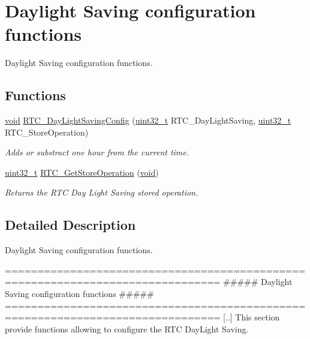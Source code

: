 \hypertarget{group___r_t_c___group5}{\section{Daylight Saving configuration functions}
\label{group___r_t_c___group5}
}


Daylight Saving configuration functions.  


\subsection*{Functions}
\begin{DoxyCompactItemize}
\item 
\hyperlink{group___n_a_m_e_ga18028b8badbf1ea7e704ccac3c488e82}{void} \hyperlink{group___r_t_c___group5_ga812feddea77990b5dc336a4989ae61b8}{R\-T\-C\-\_\-\-Day\-Light\-Saving\-Config} (\hyperlink{stdint_8h_a435d1572bf3f880d55459d9805097f62}{uint32\-\_\-t} R\-T\-C\-\_\-\-Day\-Light\-Saving, \hyperlink{stdint_8h_a435d1572bf3f880d55459d9805097f62}{uint32\-\_\-t} R\-T\-C\-\_\-\-Store\-Operation)
\begin{DoxyCompactList}\small\item\em Adds or substract one hour from the current time. \end{DoxyCompactList}\item 
\hyperlink{stdint_8h_a435d1572bf3f880d55459d9805097f62}{uint32\-\_\-t} \hyperlink{group___r_t_c___group5_gaba0c1361790203e9dca43846f0d9bc15}{R\-T\-C\-\_\-\-Get\-Store\-Operation} (\hyperlink{group___n_a_m_e_ga18028b8badbf1ea7e704ccac3c488e82}{void})
\begin{DoxyCompactList}\small\item\em Returns the R\-T\-C Day Light Saving stored operation. \end{DoxyCompactList}\end{DoxyCompactItemize}


\subsection{Detailed Description}
Daylight Saving configuration functions. \begin{DoxyVerb} ===============================================================================
                ##### Daylight Saving configuration functions #####
 ===============================================================================  
    [..] This section provide functions allowing to configure the RTC DayLight Saving.\end{DoxyVerb}


